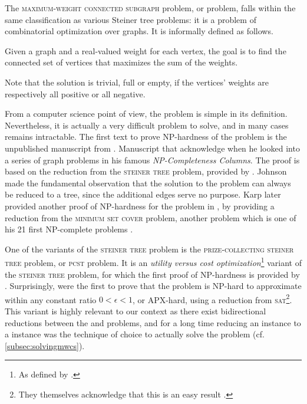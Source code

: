 	The \textsc{maximum-weight connected subgraph} problem, or \mwcs{} problem, falls within the same classification as various Steiner tree problems: it is a problem of combinatorial optimization over graphs.
	It is informally defined as follows.

	Given a graph and a real-valued weight for each vertex, the goal is to find the connected set of vertices that maximizes the sum of the weights.

	Note that the solution is trivial, full or empty, if the vertices' weights are respectively all positive or all negative.

	From a computer science point of view, the \mwcs{} problem is simple in its definition.
	Nevertheless, it is actually a very difficult problem to solve, and in many cases remains intractable.
	The first text to prove NP-hardness of the problem is the unpublished manuscript from \textcite{vergis1983manuscript}.
	Manuscript that \textcite[Section 5]{johnson1985np} acknowledge when he looked into a series of graph problems in his famous \emph{NP-Completeness Columns}.
	The proof is based on the reduction from the \textsc{steiner tree} problem, provided by \textcite{garey1979computers}.
	Johnson made the fundamental observation that the solution to the \mwcs{} problem can always be reduced to a tree, since the additional edges serve no purpose.
	Karp later provided another proof of NP-hardness for the \mwcs{} problem in \parencite[Supplementary Material]{ideker2002discovering}, by providing a reduction from the \textsc{minimum set cover} problem, another problem which is one of his 21 first NP-complete problems \parencite{karp1972reducibility}.

	One of the variants of the \textsc{steiner tree} problem is the \textsc{prize-collecting steiner tree} problem, or \textsc{pcst} problem.
	It is an \emph{utility versus cost optimization}\footnote{As defined by \textcite{conrad2007connections}.} variant of the \textsc{steiner tree} problem, for which the first proof of NP-hardness is provided by \textcite{camerini1979complexity}.
	Surprisingly, \textcite{feigenbaum2000sharing} were the first to prove that the \pcst{} problem is NP-hard to approximate within any constant ratio $0 < \epsilon < 1$, or APX-hard, using a reduction from \textsc{sat}\footnote{They themselves acknowledge that this is an easy result \parencite[footnote 12]{feigenbaum2000sharing}.}.
	This variant is highly relevant to our context as there exist bidirectional reductions between the \pcst{} and \mwcs{} problems, and for a long time reducing an \mwcs{} instance to a \pcst{} instance was the technique of choice to actually solve the problem (cf. \cref{subsec:solvingmwcs}).

